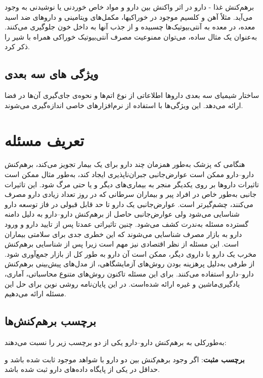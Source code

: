 برهم‌کنش غذا - دارو
در اثر واکنش بین دارو و مواد خاص خوردنی یا نوشیدنی به وجود می‌آید. مثلاً آهن و کلسیم موجود در خوراکیها، مکمل‌های ویتامینی و داروهای ضد اسید معده، در معده به آنتی‌بیوتیک‌ها چسبیده و از جذب آنها به داخل خون جلوگیری می‌کنند. به‌عنوان یک مثال ساده‌، می‌توان ممنوعیت مصرف آنتی‌بیوتیک خوراکی همراه با شیر را ذکر کرد.

\subsection{ویژگی های سه بعدی }

ساختار شیمیای سه بعدی داروها
اطلاعاتی از نوع اتم‌ها و نحوه‌ی جای‌گیری آن‌ها در فضا ارائه می‌دهد. این ویژگی‌ها با استفاده از نرم‌افزار‌های خاصی اندازه‌گیری می‌شوند.



\par
\section{تعریف مسئله}
هنگامی که پزشک به‌طور همزمان چند دارو برای یک بیمار تجویز می‌کند، برهم‌کنش دارو–دارو  ممکن است عوارض‌جانبی جبران‌ناپذیری ایجاد کند، به‌طور مثال ممکن است تاثیرات داروها بر روی یکدیگر منجر به بیماری‌ها‌ی دیگر و یا حتی مرگ شود. این تاثیرات جانبی به‌طور خاص در افراد پیر و بیماران سرطانی که در روز تعداد زیادی دارو مصرف می‌کنند، چشم‌گیرتر است. عوارض‌جانبی یک دارو تا حد قابل قبولی در فاز توسعه دارو شناسایی می‌شود ولی عوارض‌جانبی حاصل از برهم‌کنش دارو–دارو  به دلیل دامنه گسترده مسئله به‌ندرت کشف می‌شود. چنین تاثیراتی عمدتا پس از تایید دارو و ورود دارو به بازار مصرف شناسایی می‌شوند که این خطری جدی برای سلامتی بیماران است. این مسئله از نظر اقتصادی نیز مهم ‌است زیرا پس از شناسایی برهم‌کنش مخرب یک دارو با داروی دیگر، ممکن‌ است آن دارو به طور کل از بازار جمع‌آوری شود. از طرفی به‌دلیل پرهزینه بودن روش‌های آزمایشگاهی، از مدل‌های پیش‌بینی برهم‌کنش دارو–دارو  استفاده می‌کنند. برای این مسئله تا‌کنون روش‌های متنوع محاسباتی، آماری، یادگیری‌ماشین و غیره ارائه شده‌است. در این پایان‌نامه روشی نوین برای حل این مسئله ارائه می‌دهیم.
 
\subsection{برچسب برهم‌کنش‌ها}  

به‌طور‌کلی به برهم‌کنش دارو–دارو  یکی از دو برچسب زیر را نسبت می‌دهند:

\textbf{برچسب مثبت}:
اگر وجود برهم‌کنش بین دو دارو با شواهد موجود ثابت شده‌ باشد و حداقل در یکی از پایگاه داده‌های دارو ثبت شده‌ باشد.

